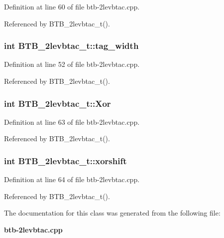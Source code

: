 Definition at line 60 of file btb-2levbtac.cpp.

Referenced by BTB\_\-2levbtac\_\-t().
\subsubsection[{tag\_\-width}]{\setlength{\rightskip}{0pt plus 5cm}int {\bf BTB\_\-2levbtac\_\-t::tag\_\-width}\hspace{0.3cm}{\tt  [protected]}}\label{classBTB__2levbtac__t_6433e672478e4d45a5c944fea65d2a56}




Definition at line 52 of file btb-2levbtac.cpp.

Referenced by BTB\_\-2levbtac\_\-t().
\subsubsection[{Xor}]{\setlength{\rightskip}{0pt plus 5cm}int {\bf BTB\_\-2levbtac\_\-t::Xor}\hspace{0.3cm}{\tt  [protected]}}\label{classBTB__2levbtac__t_834a13e0557378a5d44c10f9cdb3b40a}




Definition at line 63 of file btb-2levbtac.cpp.

Referenced by BTB\_\-2levbtac\_\-t().
\subsubsection[{xorshift}]{\setlength{\rightskip}{0pt plus 5cm}int {\bf BTB\_\-2levbtac\_\-t::xorshift}\hspace{0.3cm}{\tt  [protected]}}\label{classBTB__2levbtac__t_b3d5a60aed057157a28b7a3bb3ba8c22}




Definition at line 64 of file btb-2levbtac.cpp.

Referenced by BTB\_\-2levbtac\_\-t().

The documentation for this class was generated from the following file:\begin{CompactItemize}
\item 
{\bf btb-2levbtac.cpp}\end{CompactItemize}
